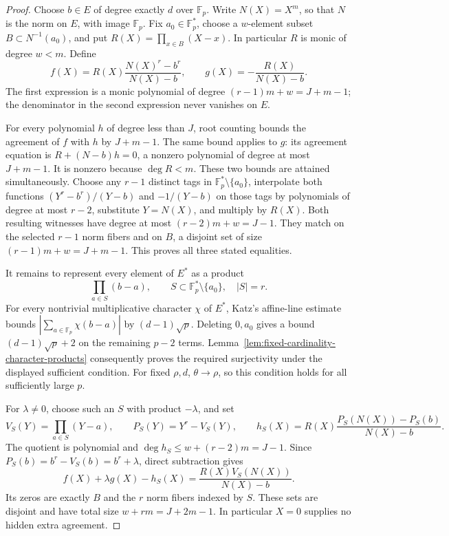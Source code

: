 \begin{proof}
Choose $b\in E$ of degree exactly $d$ over $\mathbb F_p$.
Write $N(X)=X^m$, so that $N$ is the
norm on $E$, with image $\mathbb F_p$.  Fix $a_0\in\mathbb F_p^*$, choose
a $w$-element subset $B\subset N^{-1}(a_0)$, and put
$R(X)=\prod_{x\in B}(X-x)$.  In particular $R$ is monic of degree $w<m$.
Define
\[
 f(X)=R(X)\frac{N(X)^r-b^r}{N(X)-b},\qquad
 g(X)=-\frac{R(X)}{N(X)-b}.
\]
The first expression is a monic polynomial of degree
$(r-1)m+w=J+m-1$; the denominator in the second expression never vanishes
on $E$.

For every polynomial $h$ of degree less than $J$, root counting bounds the
agreement of $f$ with $h$ by $J+m-1$.  The same bound applies to $g$:
its agreement equation is
$R+(N-b)h=0$, a nonzero polynomial of degree at most $J+m-1$.
It is nonzero because $\deg R<m$.  These two bounds are attained
simultaneously.  Choose any $r-1$ distinct tags in
$\mathbb F_p^*\setminus\{a_0\}$, interpolate both functions
$(Y^r-b^r)/(Y-b)$ and $-1/(Y-b)$ on those tags by polynomials of degree
at most $r-2$, substitute $Y=N(X)$, and multiply by $R(X)$.
Both resulting witnesses have degree at most $(r-2)m+w=J-1$.
They match on the selected $r-1$ norm fibers and on $B$, a disjoint set
of size $(r-1)m+w=J+m-1$.  This proves all three stated equalities.

It remains to represent every element of $E^*$ as a product
\[
 \prod_{a\in S}(b-a),\qquad
 S\subset\mathbb F_p^*\setminus\{a_0\},\quad |S|=r.
\]
For every nontrivial multiplicative character $\chi$ of $E^*$,
Katz's affine-line estimate~\cite[Theorem~1]{katz1989-character-sums}
bounds $|\sum_{a\in\mathbb F_p}\chi(b-a)|$ by $(d-1)\sqrt p$.
Deleting $0,a_0$ gives a bound $(d-1)\sqrt p+2$ on the remaining $p-2$ terms.
Lemma~\ref{lem:fixed-cardinality-character-products} consequently proves
the required surjectivity under the displayed sufficient condition.
For fixed $\rho,d$,
$\theta\to\rho$, so this condition holds for all sufficiently large $p$.

For $\lambda\ne0$, choose such an $S$ with product $-\lambda$, and set
\[
 V_S(Y)=\prod_{a\in S}(Y-a),\qquad
 P_S(Y)=Y^r-V_S(Y),\qquad
 h_S(X)=R(X)\frac{P_S(N(X))-P_S(b)}{N(X)-b}.
\]
The quotient is polynomial and
$\deg h_S\le w+(r-2)m=J-1$.  Since
$P_S(b)=b^r-V_S(b)=b^r+\lambda$, direct subtraction gives
\[
 f(X)+\lambda g(X)-h_S(X)
 =\frac{R(X)V_S(N(X))}{N(X)-b}.
\]
Its zeros are exactly $B$ and the $r$ norm fibers indexed by $S$.
These sets are disjoint and have total size
$w+rm=J+2m-1$.  In particular $X=0$ supplies no hidden extra agreement.
\end{proof}

